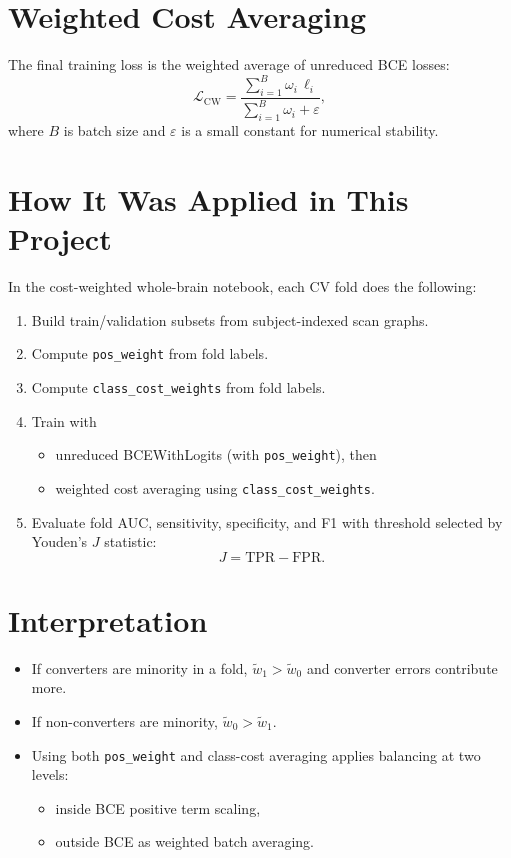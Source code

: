 \documentclass[11pt]{article}
\begin{document}
\section*{Weighted Cost Averaging}
The final training loss is the weighted average of unreduced BCE losses:
\begin{equation}
\mathcal{L}_{\text{CW}} = \frac{\sum_{i=1}^{B} \omega_i\,\ell_i}{\sum_{i=1}^{B} \omega_i + \varepsilon},
\end{equation}
where $B$ is batch size and $\varepsilon$ is a small constant for numerical stability.

\section*{How It Was Applied in This Project}
In the cost-weighted whole-brain notebook, each CV fold does the following:
\begin{enumerate}
\item Build train/validation subsets from subject-indexed scan graphs.
\item Compute \texttt{pos\_weight} from fold labels.
\item Compute \texttt{class\_cost\_weights} from fold labels.
\item Train with
\begin{itemize}
\item unreduced BCEWithLogits (with \texttt{pos\_weight}), then
\item weighted cost averaging using \texttt{class\_cost\_weights}.
\end{itemize}
\item Evaluate fold AUC, sensitivity, specificity, and F1 with threshold selected by Youden's $J$ statistic:
\begin{equation}
J = \text{TPR} - \text{FPR}.
\end{equation}
\end{enumerate}

\section*{Interpretation}
\begin{itemize}
\item If converters are minority in a fold, $\tilde{w}_1 > \tilde{w}_0$ and converter errors contribute more.
\item If non-converters are minority, $\tilde{w}_0 > \tilde{w}_1$.
\item Using both \texttt{pos\_weight} and class-cost averaging applies balancing at two levels:
\begin{itemize}
\item inside BCE positive term scaling,
\item outside BCE as weighted batch averaging.
\end{itemize}
\end{itemize}
\end{document}
